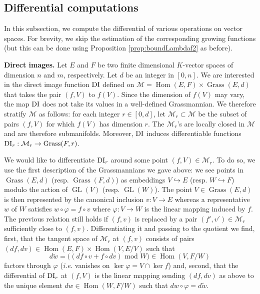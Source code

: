 \documentclass{sig-alternate}
\DeclareMathOperator{\Hom}{Hom}
\DeclareMathOperator{\GL}{GL}
\DeclareMathOperator{\Grass}{Grass}
\newcommand{\DI}{\text{\rm DI}}
\begin{document}
\subsection{Differential computations}
\label{ssec:grassdiff}

In this subsection, we compute the differential of various operations on 
vector spaces. For brevity, we skip the estimation of the corresponding 
growing functions (but this can be done using Proposition 
\ref{prop:boundLambdaf2} as before).

\smallskip

\noindent
{\bf Direct images.}
Let $E$ and $F$ be two finite dimensional $K$-vector spaces of dimension 
$n$ and $m$, respectively. Let $d$ be an integer in $[0,n]$. We are
interested in the direct image function $\DI$ defined 
on $\mathcal M = \Hom(E,F) \times \Grass(E,d)$ that takes the 
pair $(f,V)$ to $f(V)$. Since the dimension of $f(V)$ may vary,
the map $\DI$ does not take its values in a well-defined 
Grassmannian. We therefore stratify $\mathcal M$ as
follows: for each integer $r \in [0,d]$, let $\mathcal M_r \subset \mathcal M$
be the subset of pairs $(f,V)$ for which $f(V)$ has dimension $r$.
The $\mathcal M_r$'s are locally closed in $\mathcal M$ and are therefore
submanifolds. Moreover, $\DI$ induces differentiable 
functions $\DI_r : \mathcal M_r \to \Grass(F,r)$.

We would like to differentiate $\DI_r$ around some point $(f,V) \in 
\mathcal M_r$. To do so, we use the first description of the 
Grassmannians we gave above: we see points in $\Grass(E,d)$ 
(resp. $\Grass(F,d)$) as embeddings $V \hookrightarrow E$ (resp. $W 
\hookrightarrow F$) modulo the action of $\GL(V)$ (resp. $\GL(W)$).
The point $V \in \Grass(E,d)$ is then represented by the canonical 
inclusion $v : V \to E$ whereas a representative $w$ of $W$ satisfies
$w \circ \varphi = f \circ v$
where $\varphi : V \to W$ is the linear mapping induced by $f$. The 
previous relation still holds if $(f,v)$ is replaced by a pair $(f', 
v') \in \mathcal M_r$ sufficiently close to $(f,v)$.
Differentiating it and passing to the quotient we find, first, that the 
tangent space of $\mathcal M_r$ at $(f,v)$ consists of pairs $(df, dv) 
\in \Hom(E,F) \times \Hom(V,E/V)$ such that
$$d\tilde w = \big((df \circ v + f \circ dv) \text{ mod } W\big)
\in \Hom(V, F/W)$$
factors through $\varphi$ (\emph{i.e.} vanishes on $\ker \varphi = V 
\cap \ker f$) and, second, that the differential of $\DI_r$ at $(f,V)$ 
is the linear mapping sending $(df,dv)$ as above to the unique element 
$dw \in \Hom(W,F/W)$ such that $dw \circ \varphi = d \tilde w$.
\end{document}
